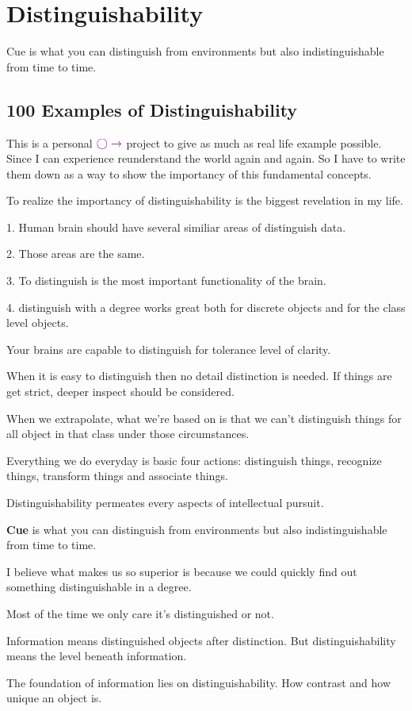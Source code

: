 \section{Distinguishability}

Cue is what you can distinguish from environments but also indistinguishable from time to time.

\subsection{100 Examples of Distinguishability}

This is a personal $\textcolor{violet}{\bigcirc\rightarrow}$ project to give as much as real life example possible. Since I can experience reunderstand the world again and again. So I have to write them down as a way to show the importancy of this fundamental concepts.

To realize the importancy of distinguishability is the biggest revelation in my life.

1. Human brain should have several similiar areas of distinguish data.

2. Those areas are the same.

3. To distinguish is the most important functionality of the brain.

4. distinguish with a degree works great both for discrete objects and for the class level objects.

Your brains are capable to distinguish for tolerance level of clarity.

When it is easy to distinguish then no detail distinction is needed. If things are get strict, deeper inspect should be considered.

When we extrapolate, what we're based on is that we can't distinguish things for all object in that class under those circumstances.


Everything we do everyday is basic four actions: distinguish things, recognize things, transform things and associate things.

Distinguishability permeates every aspects of intellectual pursuit.

\textbf{Cue} is what you can distinguish from environments but also indistinguishable from time to time.

I believe what makes us so superior is because we could quickly find out something distinguishable in a degree.

Most of the time we only care it's distinguished or not.

Information means distinguished objects after distinction. But distinguishability means the level beneath information.

The foundation of information lies on distinguishability. How contrast and how unique an object is.


